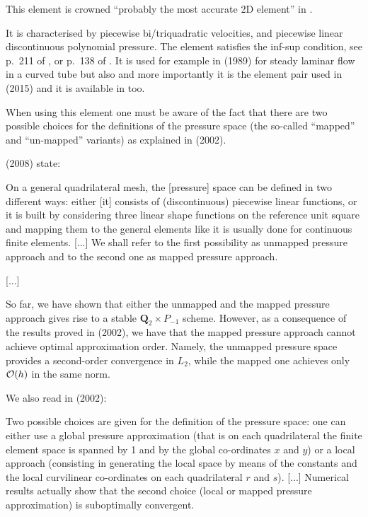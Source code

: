 \begin{center}

\end{center}

This element is crowned ``probably the most accurate 2D element'' in \textcite{grsa}.

It is characterised by piecewise bi/triquadratic velocities, 
and piecewise linear discontinuous polynomial pressure. 
The element satisfies the inf-sup condition, see p.~211 of \textcite{hugh}, or 
p.~138 of \textcite{elsw}.
It is used for example in \textcite{vavs89} (1989) for steady laminar flow in a curved tube
but also and more importantly it is the element pair used in \textcite{mabl15} (2015)
and it is available in \aspect too. 


When using this element one must be aware of the fact that there are 
two possible choices for the definitions of the pressure space 
(the so-called ``mapped'' and ``un-mapped'' variants) as explained
in \textcite{boga02} (2002). 

\textcite{bobf08} (2008) state: 
\begin{displayquote}
{\color{darkgray}
On a general quadrilateral mesh, the [pressure] space 
can be defined in two different ways: either [it] 
consists of (discontinuous) piecewise linear functions, or it is built
by considering three linear shape functions on the reference unit square and mapping
them to the general elements like it is usually done for continuous 
finite elements. [...] We shall refer to the first possibility as 
unmapped pressure approach and to the second one as mapped pressure approach.

[...] 

So far, we have shown that either the 
unmapped and the mapped pressure 
approach gives rise to a stable ${\bm Q}_2\times P_{-1}$ scheme. 
However, as a consequence of the
results proved in \textcite{arbf02} (2002), we have that the mapped 
pressure approach cannot achieve 
optimal approximation order. Namely, the unmapped pressure space 
provides a second-order convergence 
in $L_2$, while the mapped one achieves only ${\cal O}(h)$ in the same norm.}
\end{displayquote}

We also read in \textcite{boga02} (2002):
\begin{displayquote}
{\color{darkgray}
Two possible choices are given for the definition of the pressure space: 
one can either use a global pressure approximation (that is on
each quadrilateral the finite element space is spanned by 1 and by the 
global co-ordinates $x$ and $y$) or a local approach (consisting in generating 
the local space by means of the constants and the local curvilinear 
co-ordinates on each quadrilateral $r$ and $s$). [...] Numerical results 
actually show that the second choice (local or mapped pressure approximation) 
is suboptimally convergent.
}
\end{displayquote}



